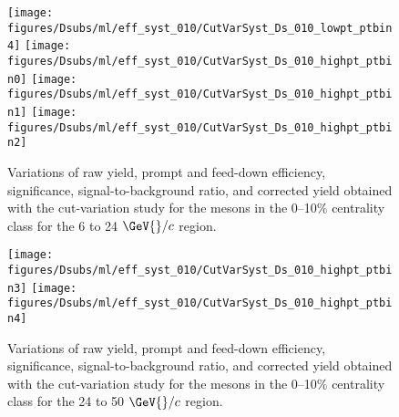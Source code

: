 \begin{figure}[!h]
  \begin{center}
    \texttt{[image: figures/Dsubs/ml/eff\_syst\_010/CutVarSyst\_Ds\_010\_lowpt\_ptbin4]}
    \texttt{[image: figures/Dsubs/ml/eff\_syst\_010/CutVarSyst\_Ds\_010\_highpt\_ptbin0]}
    \texttt{[image: figures/Dsubs/ml/eff\_syst\_010/CutVarSyst\_Ds\_010\_highpt\_ptbin1]}
    \texttt{[image: figures/Dsubs/ml/eff\_syst\_010/CutVarSyst\_Ds\_010\_highpt\_ptbin2]}
    \caption{Variations of raw yield, prompt and feed-down \Dsubs{} efficiency, significance, signal-to-background ratio, 
            and corrected yield obtained with the cut-variation study for the \Dsubs{} mesons in the 0--10\% centrality class
            for the 6 to 24 \(\GeV{}/c\) \pt{} region.}
    \label{fig:DsCutSyst010_ml_2}
  \end{center}
\end{figure}
\begin{figure}[!h]
  \begin{center}
    \texttt{[image: figures/Dsubs/ml/eff\_syst\_010/CutVarSyst\_Ds\_010\_highpt\_ptbin3]}
    \texttt{[image: figures/Dsubs/ml/eff\_syst\_010/CutVarSyst\_Ds\_010\_highpt\_ptbin4]}
    \caption{Variations of raw yield, prompt and feed-down \Dsubs{} efficiency, significance, signal-to-background ratio, 
            and corrected yield obtained with the cut-variation study for the \Dsubs{} mesons in the 0--10\% centrality class
            for the 24 to 50 \(\GeV{}/c\) \pt{} region.}
    \label{fig:DsCutSyst010_ml_3}
  \end{center}
\end{figure}

